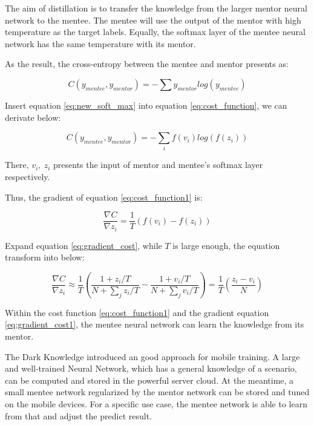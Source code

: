 \documentclass[article]{aaltoseries}
\begin{document}
The aim of distillation is to transfer the knowledge from the larger mentor neural network to the mentee. 
The mentee will use the output of the mentor with high temperature as the target labels.
Equally, the softmax layer of the mentee neural network has the same temperature with its mentor.

As the result, the cross-entropy between the mentee and mentor presents as:

\begin{equation} \label{eq:cost_function}
  C(y_{mentee}, y_{mentor}) = - \sum y_{mentor}log(y_{mentee})
\end{equation}

Insert equation \ref{eq:new_soft_max} into equation \ref{eq:cost_function}, we can derivate below:

\begin{equation} \label{eq:cost_function1}
  C(y_{mentee}, y_{mentor}) = - \sum_i f(v_i)log(f(z_i))
\end{equation}

There, \(v_i,\ z_i\) presents the input of mentor and mentee's softmax layer respectively.

Thus, the gradient of equation \ref{eq:cost_function1} is:

\begin{equation} \label{eq:gradient_cost}
  \frac{\nabla C}{\nabla z_i} = \frac{1}{T}(f(v_i) - f(z_i))
\end{equation}

Expand equation \ref{eq:gradient_cost}, while \(T\) is large enough, the equation transform into below:

\begin{equation} \label{eq:gradient_cost1}
  \frac{\nabla C}{\nabla z_i} \approx \frac{1}{T}( \frac{1+z_i/T}{N+\sum_j z_i/T} - \frac{1+v_i/T}{N+\sum_j v_i/T} ) = \frac{1}{T} (\frac{z_i - v_i}{N})
\end{equation}

Within the cost function \ref{eq:cost_function1} and the gradient equation \ref{eq:gradient_cost1}, 
the mentee neural network can learn the knowledge from its mentor.

The Dark Knowledge introduced an good approach for mobile training. 
A large and well-trained Neural Network, which has a general knowledge of a scenario, can be computed and stored in the powerful server cloud.
At the meantime, a small mentee network regularized by the mentor network can be stored and tuned on the mobile devices.
For a specific use case, the mentee network is able to learn from that and adjust the predict result. 
\end{document}

